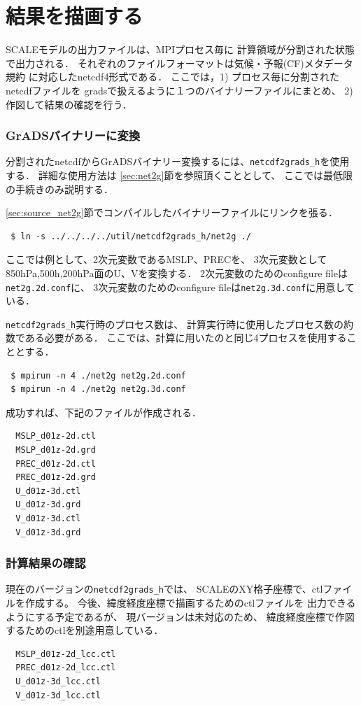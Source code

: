 \section{結果を描画する}
\label{sec:quicklook}

SCALEモデルの出力ファイルは、MPIプロセス毎に
計算領域が分割された状態で出力される．
それぞれのファイルフォーマットは気候・予報(CF)メタデータ規約
に対応したnetcdf4形式である．
ここでは，1) プロセス毎に分割されたnetcdfファイルを
gradsで扱えるように１つのバイナリーファイルにまとめ、
2) 作図して結果の確認を行う．

\subsubsection{GrADSバイナリーに変換}
分割されたnetcdfからGrADSバイナリー変換するには、\verb|netcdf2grads_h|を使用する．
詳細な使用方法は \ref{sec:net2g}節を参照頂くこととして、
ここでは最低限の手続きのみ説明する．

\ref{sec:source_net2g}節でコンパイルしたバイナリーファイルにリンクを張る．
\begin{verbatim}
 $ ln -s ../../../../util/netcdf2grads_h/net2g ./
\end{verbatim}
ここでは例として、2次元変数であるMSLP、PRECを、
3次元変数として850hPa,500h,200hPa面のU、Vを変換する．
2次元変数のためのconfigure fileは\verb|net2g.2d.conf|に、
3次元変数のためのconfigure fileは\verb|net2g.3d.conf|に用意している．

\verb|netcdf2grads_h|実行時のプロセス数は、
計算実行時に使用したプロセス数の約数である必要がある．
ここでは、計算に用いたのと同じ4プロセスを使用することとする．
\begin{verbatim}
 $ mpirun -n 4 ./net2g net2g.2d.conf
 $ mpirun -n 4 ./net2g net2g.3d.conf
\end{verbatim}
成功すれば、下記のファイルが作成される．
\begin{verbatim}
  MSLP_d01z-2d.ctl
  MSLP_d01z-2d.grd
  PREC_d01z-2d.ctl
  PREC_d01z-2d.grd
  U_d01z-3d.ctl
  U_d01z-3d.grd
  V_d01z-3d.ctl
  V_d01z-3d.grd
\end{verbatim}


\subsubsection{計算結果の確認}
現在のバージョンの\verb|netcdf2grads_h|では、
SCALEのXY格子座標で、ctlファイルを作成する。
今後、緯度経度座標で描画するためのctlファイルを
出力できるようにする予定であるが、
現バージョンは未対応のため、
緯度経度座標で作図するためのctlを別途用意している．
\begin{verbatim}
  MSLP_d01z-2d_lcc.ctl
  PREC_d01z-2d_lcc.ctl
  U_d01z-3d_lcc.ctl
  V_d01z-3d_lcc.ctl
\end{verbatim}

